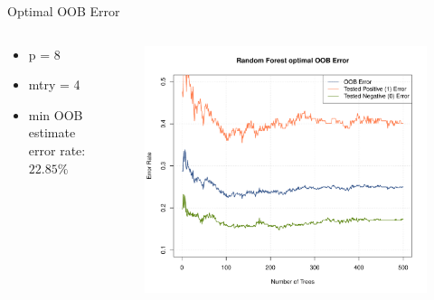 \begin{frame}{Optimal OOB Error}

\begin{columns}
\begin{column}{0.35\textwidth}
{\footnotesize \begin{itemize}
    \item p = 8
    \item mtry = 4 
    \item min OOB estimate error rate: $22.85\%$
\end{itemize}}

\end{column}
\begin{column}{0.75\textwidth}
\begin{figure}
\includegraphics[width=1.05\columnwidth]{plots/diabete_forest_error_opt.pdf}
\end{figure}
\end{column}
\end{columns}

\end{frame}


